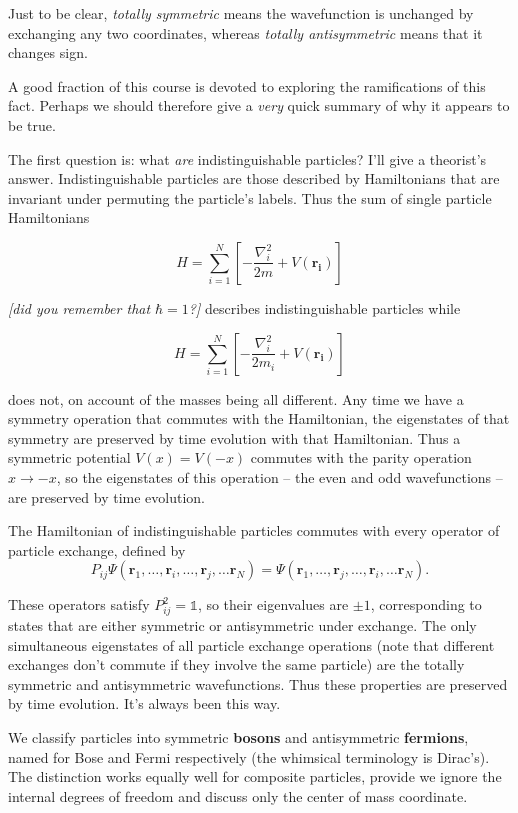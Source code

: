\documentclass[
  letterpaper,
  DIV=11,
  numbers=noendperiod]{scrreprt}
\begin{document}
Just to be clear, \emph{totally symmetric} means the wavefunction is
unchanged by exchanging any two coordinates, whereas \emph{totally
antisymmetric} means that it changes sign.

A good fraction of this course is devoted to exploring the ramifications
of this fact. Perhaps we should therefore give a \emph{very} quick
summary of why it appears to be true.

The first question is: what \emph{are} indistinguishable particles? I'll
give a theorist's answer. Indistinguishable particles are those
described by Hamiltonians that are invariant under permuting the
particle's labels. Thus the sum of single particle Hamiltonians

\[
H = \sum_{i=1}^{N} \left[-\frac{\nabla_i^{2}}{2m}+V(\mathbf{r_i})\right]
\]

\emph{{[}did you remember that \(\hbar=1\)?{]}} describes
indistinguishable particles while

\[
H = \sum_{i=1}^{N} \left[-\frac{\nabla_i^{2}}{2m_i}+V(\mathbf{r_i})\right]
\]

does not, on account of the masses being all different. Any time we have
a symmetry operation that commutes with the Hamiltonian, the eigenstates
of that symmetry are preserved by time evolution with that Hamiltonian.
Thus a symmetric potential \(V(x)=V(-x)\) commutes with the parity
operation \(x\to -x\), so the eigenstates of this operation -- the even
and odd wavefunctions -- are preserved by time evolution.

The Hamiltonian of indistinguishable particles commutes with every
operator of particle exchange, defined by \[
P_{ij}\Psi(\mathbf{r}_1,\ldots, \mathbf{r}_i,\ldots, \mathbf{r}_j,\ldots \mathbf{r}_N) = \Psi(\mathbf{r}_1,\ldots, \mathbf{r}_j,\ldots, \mathbf{r}_i,\ldots \mathbf{r}_N).
\]

These operators satisfy \(P_{ij}^2=\mathbb{1}\), so their eigenvalues
are \(\pm 1\), corresponding to states that are either symmetric or
antisymmetric under exchange. The only simultaneous eigenstates of all
particle exchange operations (note that different exchanges don't
commute if they involve the same particle) are the totally symmetric and
antisymmetric wavefunctions. Thus these properties are preserved by time
evolution. It's always been this way.

We classify particles into symmetric \textbf{bosons} and antisymmetric
\textbf{fermions}, named for Bose and Fermi respectively (the whimsical
terminology is Dirac's). The distinction works equally well for
composite particles, provide we ignore the internal degrees of freedom
and discuss only the center of mass coordinate.
\end{document}

